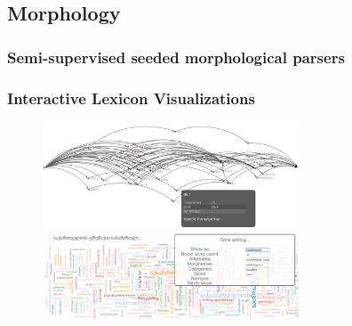 \documentclass{beamer}
\begin{document}
\subsection{Morphology}



%
%





\subsubsection[DataViz]{Semi-supervised seeded morphological parsers}

\begin{frame}

\frametitle{\large Interactive Lexicon Visualizations}

\begin{figure}
\begin{center}
\includegraphics[width=3in]{../figures/lexicon_browser}\\
\includegraphics[width=3in]{../figures/lexicon_browser2}
\label{lexicon_browser_screenshot}
\end{center}
\end{figure}

\end{frame}
\end{document}
